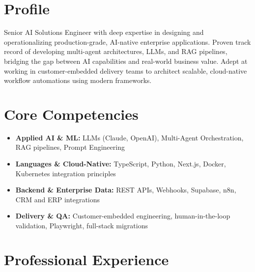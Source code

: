 \documentclass[11pt,a4paper,sans]{moderncv}
\begin{document}
\makecvtitle

\section{Profile}
Senior AI Solutions Engineer with deep expertise in designing and operationalizing production-grade, AI-native enterprise applications. Proven track record of developing multi-agent architectures, LLMs, and RAG pipelines, bridging the gap between AI capabilities and real-world business value. Adept at working in customer-embedded delivery teams to architect scalable, cloud-native workflow automations using modern frameworks.

\section{Core Competencies}
\begin{itemize}
\item \textbf{Applied AI \& ML:} LLMs (Claude, OpenAI), Multi-Agent Orchestration, RAG pipelines, Prompt Engineering
\item \textbf{Languages \& Cloud-Native:} TypeScript, Python, Next.js, Docker, Kubernetes integration principles
\item \textbf{Backend \& Enterprise Data:} REST APIs, Webhooks, Supabase, n8n, CRM and ERP integrations
\item \textbf{Delivery \& QA:} Customer-embedded engineering, human-in-the-loop validation, Playwright, full-stack migrations
\end{itemize}

\section{Professional Experience}

\end{document}
